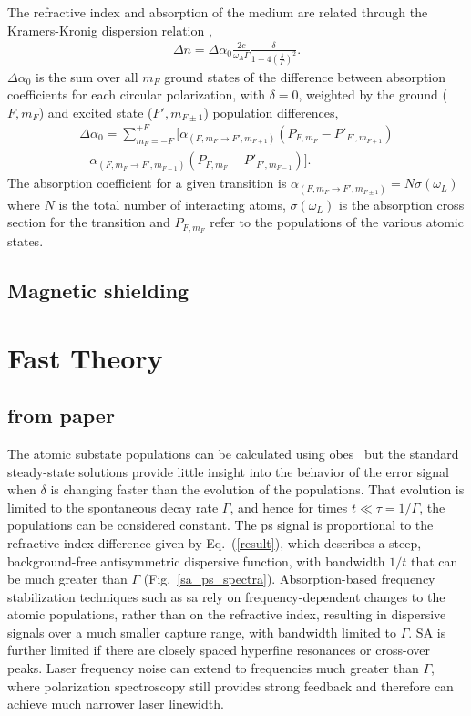 The refractive index and absorption of the medium are related through the Kramers-Kronig dispersion relation \cite{demtroder_laser_2003},
\begin{align}
\Delta n = \Delta\alpha_0 \frac{2c}{\omega_A \Gamma}\frac{\delta}{1+4\left(\frac{\delta}{\Gamma}\right)^2}.\label{result}
\end{align}
$\Delta\alpha_0$ is the sum over all $m_F$ ground states of the difference between absorption coefficients for each circular polarization, with $\delta=0$, weighted by the ground ($F, m_F$) and excited state ($F', m_{F\pm1}$) population differences,
\begin{align}
\Delta\alpha_0 = \sum_{m_F=-F}^{+F} \big[\alpha_{(F,m_F\rightarrow F',m_{F+1})}(P_{F,m_F}-P'_{F',m_{F+1}})\nonumber\\
-\alpha_{(F,m_F\rightarrow F',m_{F-1})}(P_{F,m_F}-P'_{F',m_{F-1}})\big].
\end{align}
The absorption coefficient for a given transition is $\alpha_{(F, m_F\rightarrow F',m_{F\pm1})}=N \sigma(\omega_L)$ where $N$ is the total number of interacting atoms, $\sigma(\omega_L)$ is the absorption cross section for the transition and $P_{F,m_F}$ refer to the populations of the various atomic states.

\subsection{Magnetic shielding}

\section{Fast Theory}

\subsection{from paper}
The atomic substate populations can be calculated using \glspl*{obe}~\cite{hughes_polarization_2009} but the standard steady-state solutions provide little insight into the behavior of the error signal when $\delta$ is changing faster than the evolution of the populations.
That evolution is limited to the spontaneous decay rate $\Gamma$, and hence for times $t\ll \tau=1/\Gamma$, the populations can be considered constant.
The \gls*{ps} signal is proportional to the refractive index difference given by Eq.~(\ref{result}), which describes a steep, background-free antisymmetric dispersive function, with bandwidth $1/t$ that can be much greater than $\Gamma$ (Fig.~\ref{sa_ps_spectra}).
Absorption-based frequency stabilization techniques such as \gls*{sa} rely on frequency-dependent changes to the atomic populations, rather than on the refractive index, resulting in dispersive signals over a much smaller capture range, with bandwidth limited to $\Gamma$.
SA is further limited if there are closely spaced hyperfine resonances or cross-over peaks.
Laser frequency noise can extend to frequencies much greater than $\Gamma$, where polarization spectroscopy still provides strong feedback and therefore can achieve much narrower laser linewidth.

